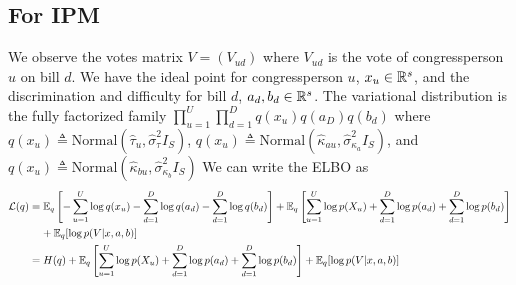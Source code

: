 \documentclass{article}
\begin{document}
\newpage


\subsection{For IPM}
We observe the votes matrix $V = (V_{ud})$ where $V_{ud}$ is the vote of congressperson $u$ on bill $d$. We have the ideal point for congressperson $u$, $x_u \in \mathbb{R}^s$, and the discrimination and difficulty for bill $d$, $a_d,b_d \in \mathbb{R}^s$. The variational distribution is the fully factorized family $\prod_{u=1}^U \prod_{d=1}^D q(x_u)q(a_D)q(b_d)$ where $q(x_u) \triangleq \text{Normal}(\hat{\tau}_u, \hat{\sigma}^2_\tau I_S)$, $q(x_u) \triangleq \text{Normal}(\hat{\kappa}_{au}, \hat{\sigma}^2_{\kappa_a} I_S)$, and $q(x_u) \triangleq \text{Normal}(\hat{\kappa}_{bu}, \hat{\sigma}^2_{\kappa_b} I_S)$
\vskip 10pt
We can write the ELBO as 
\begin{align*}
\mathcal{L}(q) & = \mathbb{E}_q\left[-\sum_{u=1}^U\log q(x_u) - \sum_{d=1}^D \log q(a_d) - \sum_{d=1}^D \log q(b_d)\right] + \mathbb{E}_q\left[\sum_{u=1}^U \log p(X_{u}) +\sum_{d=1}^D \log p(a_d) + \sum_{d=1}^D \log p(b_d)\right]\\
& \;\;\;\; + \mathbb{E}_q[\log p(V|x,a,b)]\\
& = H(q) +  \mathbb{E}_q\left[\sum_{u=1}^U \log p(X_{u}) +\sum_{d=1}^D \log p(a_d) + \sum_{d=1}^D \log p(b_d)\right] + \mathbb{E}_q[\log p(V|x,a,b)]\\
\end{align*}
\end{document}
